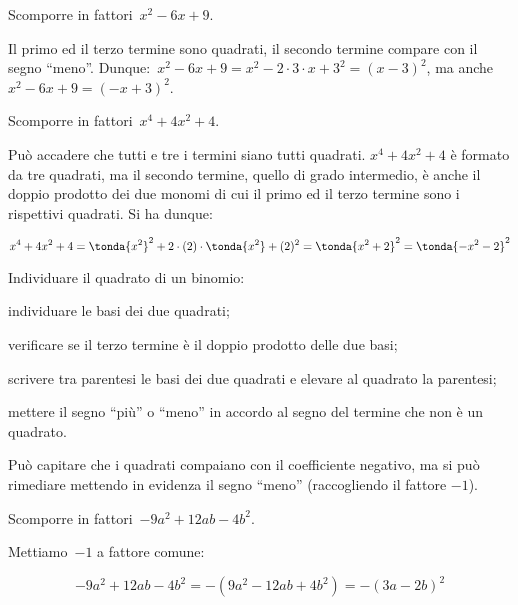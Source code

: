 \begin{esempio}{}{}
Scomporre in fattori~\(x^2-6x+9\).

Il primo ed il terzo termine sono quadrati, il secondo termine compare 
con il segno ``meno''.
Dunque:~\(x^2-6x+9=x^2-2\cdot 3\cdot x+3^{2}=(x-3)^{2}\), 
ma anche~\(x^2-6x+9=(-x+3)^{2}\).
\end{esempio}

\begin{esempio}{}{}
Scomporre in fattori~\(x^4+4x^2+4\).

Può accadere che tutti e tre i termini siano tutti quadrati. 
\(x^4+4x^2+4\) è formato da tre quadrati, ma il secondo termine, quello 
di grado intermedio, è anche il doppio prodotto dei due monomi di cui il 
primo ed il terzo termine sono i rispettivi quadrati.
Si ha dunque:

\vspace{-1.8em}
\[x^4+4x^2+4=
  \tonda{x^2}^{2}+2 \cdot (2) \cdot \tonda{x^2}+(2)^{2}=
  \tonda{x^2+2}^{2}=\tonda{-x^2-2}^{2}\]
\end{esempio}

\begin{procedura}{}{}
Individuare il quadrato di un binomio:
\begin{enumeratea}
\item individuare le basi dei due quadrati;
\item verificare se il terzo termine è il doppio prodotto delle due basi;
\item scrivere tra parentesi le basi dei due quadrati e elevare al 
quadrato la parentesi;
\item mettere il segno ``più'' o ``meno'' in accordo al segno del termine 
che non è un quadrato.
\end{enumeratea}
\end{procedura}

Può capitare che i quadrati compaiano con il coefficiente negativo, ma si 
può rimediare mettendo in evidenza il segno ``meno'' (raccogliendo il 
fattore \(-1\)).

\begin{esempio}{}{}
Scomporre in fattori~\(-9a^{2}+12{ab}-4b^{2}\).

Mettiamo~\(-1\) a fattore comune:

\vspace{-1.0em}
\[-9a^{2}+12ab-4b^{2}=-(9a^{2}-12{ab}+4b^{2})=-(3a-2b)^{2}\]
\end{esempio}

